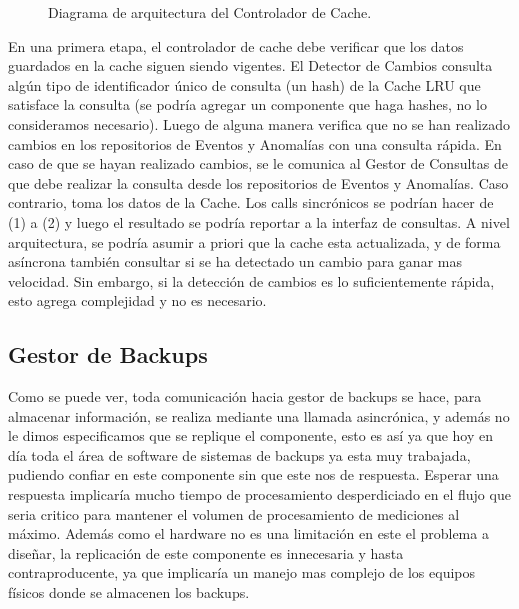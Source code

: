 \documentclass{article}
\theoremstyle{definition}
\theoremstyle{remark}
\begin{document}
\begin{figure}[H]
  \caption{Diagrama de arquitectura del Controlador de Cache.}
\end{figure}

En una primera etapa, el controlador de cache debe verificar que los datos guardados en la cache siguen siendo vigentes. El Detector de Cambios consulta algún tipo de identificador único de consulta (un hash) de la Cache LRU que satisface la consulta (se podría agregar un componente que haga hashes, no lo consideramos necesario). Luego de alguna manera verifica que no se han realizado cambios en los repositorios de Eventos y Anomalías con una consulta rápida. En caso de que se hayan realizado cambios, se le comunica al Gestor de Consultas de que debe realizar la consulta desde los repositorios de Eventos y Anomalías. Caso contrario, toma los datos de la Cache. Los calls sincrónicos se podrían hacer de (1) a (2) y luego el resultado se podría reportar a la interfaz de consultas. A nivel arquitectura, se podría asumir a priori que la cache esta actualizada, y de forma asíncrona también consultar si se ha detectado un cambio para ganar mas velocidad. Sin embargo, si la detección de cambios es lo suficientemente rápida, esto agrega complejidad y no es necesario.

\subsection{Gestor de Backups}

Como se puede ver, toda comunicación hacia gestor de backups se hace, para almacenar información, se realiza mediante una llamada asincrónica, y además no le dimos especificamos que se replique el componente, esto es así ya que hoy en día toda el área de software de sistemas de backups ya esta muy trabajada, pudiendo confiar en este componente sin que este nos de respuesta. Esperar una respuesta implicaría mucho tiempo de procesamiento desperdiciado en el flujo que seria critico para mantener el volumen de procesamiento de mediciones al máximo. Además como el hardware no es una limitación en este el problema a diseñar, la replicación de este componente es innecesaria y hasta contraproducente, ya que implicaría un manejo mas complejo de los equipos físicos donde se almacenen los backups.
\end{document}
